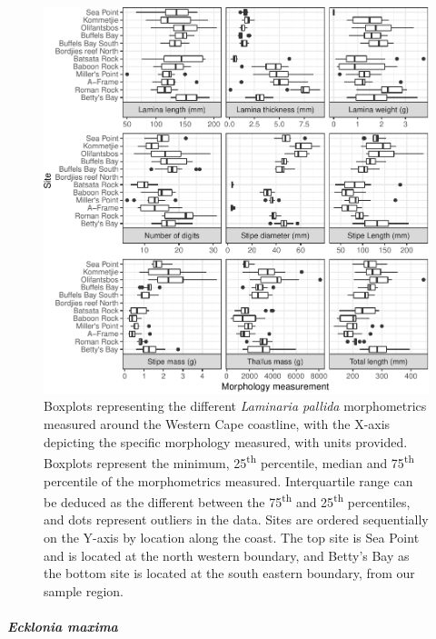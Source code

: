 \documentclass[10pt,a4,]{article}
\makeatletter
\def\maxwidth{\ifdim\Gin@nat@width>\linewidth\linewidth
\else\Gin@nat@width\fi}
\let\Oldincludegraphics\includegraphics
\renewcommand{\includegraphics}[1]{\Oldincludegraphics[width=\maxwidth]{#1}}
\makeatother
\begin{document}
\begin{figure}
\centering
\includegraphics{chapter_2_files/figure-latex/unnamed-chunk-17-1.pdf}
\caption{Boxplots representing the different \emph{Laminaria pallida}
morphometrics measured around the Western Cape coastline, with the
X-axis depicting the specific morphology measured, with units provided.
Boxplots represent the minimum, 25\textsuperscript{th} percentile,
median and 75\textsuperscript{th} percentile of the morphometrics
measured. Interquartile range can be deduced as the different between
the 75\textsuperscript{th} and 25\textsuperscript{th} percentiles, and
dots represent outliers in the data. Sites are ordered sequentially on
the Y-axis by location along the coast. The top site is Sea Point and is
located at the north western boundary, and Betty's Bay as the bottom
site is located at the south eastern boundary, from our sample region.}
\end{figure}

\hypertarget{ecklonia-maxima}{%
\paragraph{\texorpdfstring{\emph{Ecklonia
maxima}}{Ecklonia maxima}}\label{ecklonia-maxima}}
\end{document}
